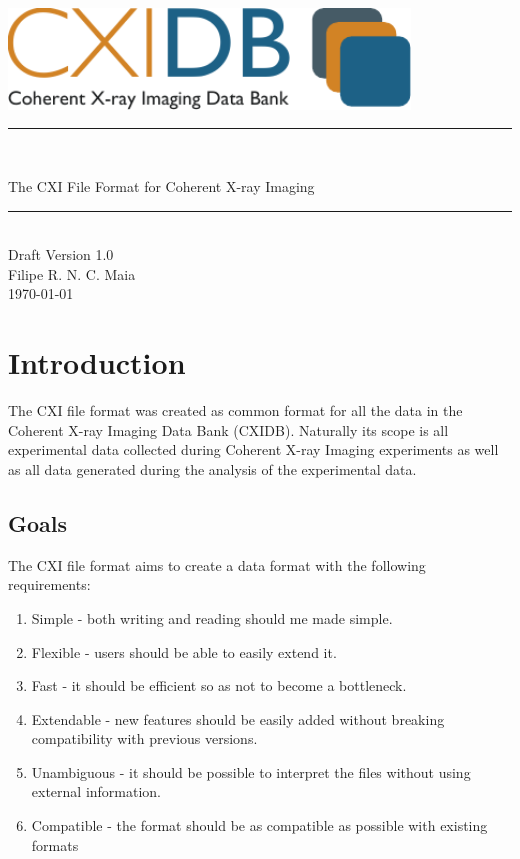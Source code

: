 \documentclass[usletter,11pt]{article}
\newcommand{\HRule}{{\color{brightOrange} \rule{\linewidth}{0.5mm}}}
\begin{document}
\begin{center}
\vspace*{2.5cm}
\includegraphics[width=0.8\textwidth]{cxidb_logo_large.pdf}\\[2.0cm]

\HRule \\[0.6cm]
\begin{spacing}{2.0}
{\color{softBlue} \Huge \sffamily The CXI File Format for Coherent
 X-ray Imaging}\\[0.2cm]
\end{spacing}
\HRule \\[1.0cm]
{\Large \color{softBlue} \sffamily Draft Version 1.0}\\[4.5cm]

{\Large \color{softBlue} \sffamily Filipe R. N. C. Maia}\\[0.3cm]
{\Large \color{softBlue} \sffamily \today}
\thispagestyle{empty}
\end{center}

\pagebreak

\thispagestyle{fancy}

\tableofcontents

\pagebreak



\setcounter{page}{1}

\section{Introduction}
The CXI file format was created as common format for all the data in the Coherent X-ray Imaging Data Bank (CXIDB).
Naturally its scope is all experimental data collected during Coherent X-ray Imaging experiments as well as all data generated during the analysis of the experimental data.

\subsection{Goals}
The CXI file format aims to create a data format with the following requirements:
\begin{enumerate}
\item{Simple - both writing and reading should me made simple.}
\item{Flexible - users should be able to easily extend it.}
\item{Fast - it should be efficient so as not to become a bottleneck.}
\item{Extendable - new features should be easily added without breaking compatibility with previous versions.}
\item{Unambiguous - it should be possible to interpret the files without using external information.}
\item{Compatible - the format should be as compatible as possible with existing formats}
\end{enumerate}
\end{document}
